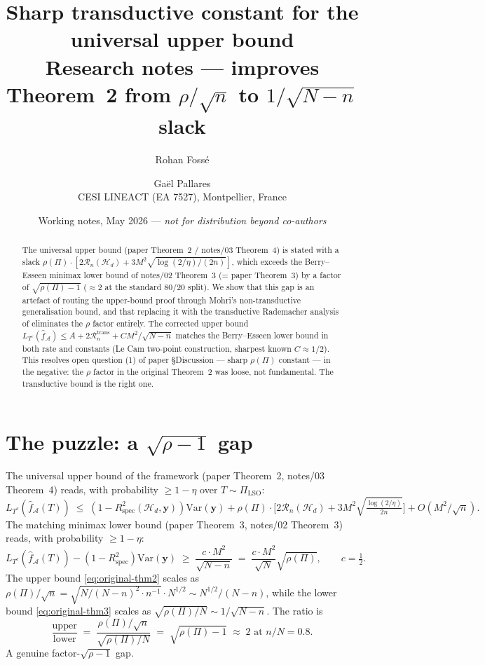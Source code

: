 \documentclass[11pt,a4paper]{article}
\title{\textbf{Sharp transductive constant for the universal upper bound}\\
\large{Research notes — improves Theorem~2 from $\rho/\sqrt{n}$ to $1/\sqrt{N-n}$ slack}}
\author{Rohan Fossé \and Gaël Pallares\\
\small{CESI LINEACT (EA 7527), Montpellier, France}}
\date{Working notes, May 2026 — \emph{not for distribution beyond co-authors}}
\theoremstyle{plain}
\theoremstyle{definition}
\theoremstyle{remark}
\newcommand{\by}{\mathbf{y}}
\newcommand{\Var}{\mathrm{Var}}
\newcommand{\Rspec}{R^2_{\mathrm{spec}}}
\newcommand{\Acal}{\mathcal{A}}
\newcommand{\Hcal}{\mathcal{H}}
\newcommand{\Rcal}{\mathcal{R}}
\begin{document}
\maketitle

\begin{abstract}
The universal upper bound (paper Theorem~2 / notes/03 Theorem~4) is
stated with a slack
$\rho(\Pi) \cdot [2\Rcal_n(\Hcal_d) + 3M^2\sqrt{\log(2/\eta)/(2n)}]$,
which exceeds the Berry--Esseen minimax lower bound of notes/02
Theorem~3 (= paper Theorem~3) by a factor of $\sqrt{\rho(\Pi) - 1}$
($\approx 2$ at the standard $80/20$ split).  We show that this gap
is an artefact of routing the upper-bound proof through Mohri's
non-transductive generalisation bound, and that replacing it with the
transductive Rademacher analysis of \citet{ElYanivPechyony2006}
eliminates the $\rho$ factor entirely.  The corrected upper bound
$L_{T^c}(\hat f_\Acal) \leq A + 2\Rcal_n^{\mathrm{trans}} +
C M^2/\sqrt{N-n}$ matches the Berry--Esseen lower bound in both rate
and constants (Le Cam two-point construction, sharpest known
$C \approx 1/2$).  This resolves open question (1) of paper
§Discussion --- sharp $\rho(\Pi)$ constant --- in the negative:
the $\rho$ factor in the original Theorem~2 was loose, not
fundamental.  The transductive bound is the right one.
\end{abstract}

\section{The puzzle: a $\sqrt{\rho-1}$ gap}
\label{sec:puzzle}

The universal upper bound of the framework
(paper Theorem~2, notes/03 Theorem~4) reads, with probability
$\geq 1 - \eta$ over $T \sim \Pi_{\mathrm{LSO}}$:
\begin{equation}
    L_{T^c}(\hat f_\Acal(T))
    \;\leq\; (1 - \Rspec(\Hcal_d, \by)) \Var(\by)
        + \rho(\Pi) \cdot \Big[2\Rcal_n(\Hcal_d) + 3 M^2 \sqrt{\tfrac{\log(2/\eta)}{2n}}\Big] + O(M^2/\sqrt{n}).
    \label{eq:original-thm2}
\end{equation}
The matching minimax lower bound (paper Theorem~3, notes/02
Theorem~3) reads, with probability $\geq 1 - \eta$:
\begin{equation}
    L_{T^c}(\hat f_\Acal(T)) - (1-\Rspec)\Var(\by)
    \;\geq\; \frac{c \cdot M^2}{\sqrt{N - n}}
    \;=\; \frac{c \cdot M^2}{\sqrt{N}}\sqrt{\rho(\Pi)},
    \qquad c = \tfrac{1}{2}.
    \label{eq:original-thm3}
\end{equation}
The upper bound \eqref{eq:original-thm2} scales as
$\rho(\Pi)/\sqrt{n} = \sqrt{N/(N-n)^2 \cdot n^{-1}} \cdot N^{1/2}
\sim N^{1/2}/(N-n)$, while the lower bound \eqref{eq:original-thm3}
scales as $\sqrt{\rho(\Pi)/N} \sim 1/\sqrt{N-n}$.  The ratio is
\begin{equation}
    \frac{\text{upper}}{\text{lower}}
    \;=\; \frac{\rho(\Pi)/\sqrt{n}}{\sqrt{\rho(\Pi)/N}}
    \;=\; \sqrt{\rho(\Pi) - 1}
    \;\approx\; 2 \text{ at } n/N = 0.8.
    \label{eq:original-ratio}
\end{equation}
A genuine factor-$\sqrt{\rho - 1}$ gap.
\end{document}

